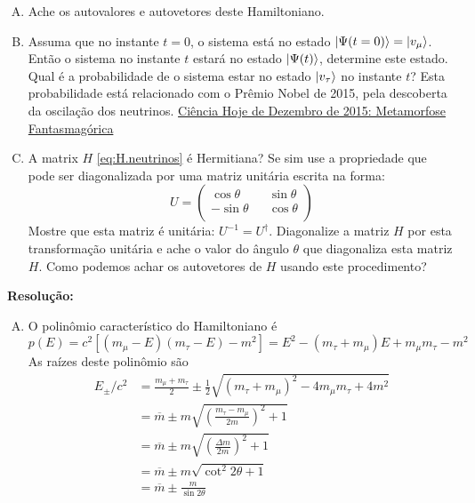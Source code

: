 \documentclass[a4paper, 12pt, notitlepage]{article}
\begin{document}
\begin{enumerate}
\begin{enumerate}[(A)]
  \item Ache os autovalores e autovetores deste Hamiltoniano.
  \item Assuma que no instante $t=0$, o sistema está no estado $\ket{\Psi(t = 0)} = \ket{v_\mu}$. Então o sistema no instante $t$ estará no estado $\ket{\Psi(t)}$, determine este estado. Qual é a probabilidade de o sistema estar no estado $\ket{v_\tau}$ no instante $t$?\linebreak
  Esta probabilidade está relacionado com o Prêmio Nobel de 2015, pela descoberta da oscilação dos neutrinos. \href{http://assinaturadigital.cienciahoje.org.br/revistas/reduzidas/332/files/assets/basic-html/index.html#1}{Ciência Hoje de Dezembro de 2015: Metamorfose Fantasmagórica}
  \item A matrix $H$ \eqref{eq:H.neutrinos} é Hermitiana? Se sim use a propriedade que pode ser diagonalizada por uma matriz unitária escrita na forma:
  \begin{equation}
  U = 
    \begin{pmatrix}
    \cos \theta && \sin \theta \\
    -\sin \theta && \cos \theta \\
    \end{pmatrix}
  \end{equation}
  Mostre que esta matriz é unitária: $U^{-1} = U^\dagger$.
  Diagonalize a matriz $H$ por esta transformação unitária e ache o valor do ângulo $\theta$ que diagonaliza esta matriz $H$. Como podemos achar os autovetores de $H$ usando este procedimento?
\end{enumerate}

\textbf{Resolução: }

\begin{enumerate}[(A)]
  \item O polinômio característico do Hamiltoniano é
  \[ p(E) = c^2\left[(m_\mu - E)(m_\tau - E) - m^2\right] = E^2 - (m_\tau + m_\mu) E + m_\mu m_\tau - m^2 \]
  As raízes deste polinômio são
  \begin{align*}
   E_{\pm}/c^2 &= \frac{m_\mu + m_\tau}{2} \pm \frac{1}{2} \sqrt{(m_\tau + m_\mu)^2 - 4m_\mu m_\tau + 4m^2} \\
   &= \overline{m} \pm m \sqrt{ \left(\frac{m_\tau - m_\mu}{2m}\right)^2 + 1} \\
   &= \overline{m} \pm m \sqrt{ \left(\frac{\Delta m}{2m}\right)^2 + 1} \\
   &= \overline{m} \pm m \sqrt{ \cot^2 2\theta + 1 } \\
   &= \overline{m} \pm \frac{m}{\sin 2\theta}
  \end{align*}
  

\end{enumerate}
\end{enumerate}
\end{document}
